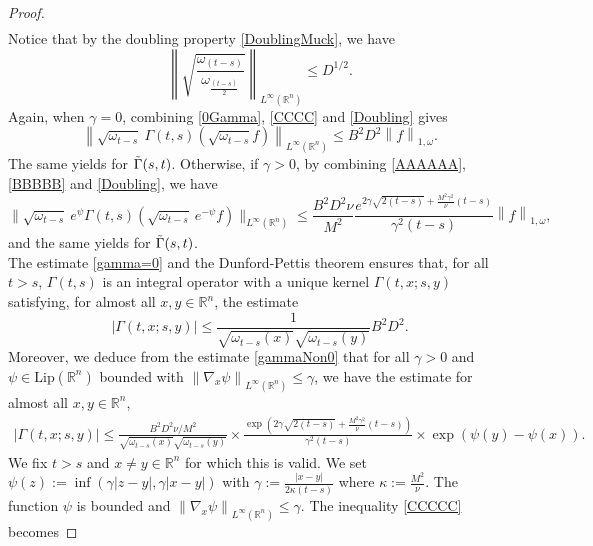 \documentclass[12pt, letterpaper]{amsart}
\theoremstyle{definition}
\theoremstyle{remark}
\numberwithin{equation}{section}
\begin{document}
\begin{proof}
\begin{align*}
\end{align*}
Notice that by the doubling property \eqref{DoublingMuck}, we have 
\begin{equation}\label{Doubling}
    \left \|  \sqrt{\frac{\omega_{(t-s)}}{\omega_{\frac{(t-s)}{2}}}} \right \|_{L^\infty(\mathbb{R}^n)} \leq D^{1/2}.
\end{equation}
Again, when $\gamma=0$, combining \eqref{0Gamma}, \eqref{CCCC} and \eqref{Doubling} gives
\begin{equation}\label{gamma=0}
    \left \| \sqrt{\omega_{t-s}} \ \Gamma(t,s)(\sqrt{\omega_{t-s}} f) \right \|_{L^\infty(\mathbb{R}^n)}\leq B^2 D^2 \left \|f  \right \|_{1,\omega}.
\end{equation}
The same yields for $\Tilde{\Gamma}(s,t)$. Otherwise, if $\gamma>0$, by combining \eqref{AAAAAA}, \eqref{BBBBB} and \eqref{Doubling}, we have
\begin{equation}\label{gammaNon0}
      \| \sqrt{\omega_{t-s}}\ e^\psi \Gamma(t,s)(\sqrt{\omega_{t-s}}\ e^{-\psi}f)  \|_{L^\infty(\mathbb{R}^n)}\leq \frac{B^2D^2\nu}{M^2}\frac{e^{2\gamma \sqrt{2(t-s)}+\frac{M^2\gamma^2}{\nu}(t-s)}}{\gamma^2(t-s)}  \left \|f  \right \|_{1,\omega},
\end{equation}
and the same yields for $\Tilde{\Gamma}(s,t)$.\\
The estimate \eqref{gamma=0} and the Dunford-Pettis theorem \cite{dunford1940linear} ensures that, for all $t>s$, $\Gamma(t,s)$ is an integral operator with a unique kernel $\Gamma(t,x;s,y)$ satisfying, for almost all $x,y \in \mathbb{R}^n$, the estimate
\begin{equation}\label{DDD}
    \left | \Gamma(t,x;s,y) \right |\leq \frac{1}{\sqrt{\omega_{t-s}(x)}\sqrt{\omega_{t-s}(y)}}  B^2 D^2.
\end{equation}
Moreover, we deduce from the estimate \eqref{gammaNon0} that for all $\gamma>0$ and $\psi \in \mathrm{Lip}(\mathbb{R}^n)$ bounded with $\left \| \nabla_x  \psi \right \|_{L^\infty(\mathbb{R}^n)}\leq \gamma$, we have the estimate for almost all $x,y \in \mathbb{R}^n$, 
\begin{align}\label{CCCCC}
    \left | \Gamma(t,x;s,y) \right | \leq \frac{B^2D^2\nu/M^2}{\sqrt{\omega_{t-s}(x)}\sqrt{\omega_{t-s}(y)}} \times \frac{\exp(2\gamma \sqrt{2(t-s)}+\frac{M^2\gamma^2}{\nu}(t-s))}{\gamma^2(t-s)}\times \exp(\psi(y)-\psi(x)).
\end{align}
We fix $t>s$ and $x\neq y\in \mathbb{R}^n$ for which this is valid. We set $\psi(z):=\inf(\gamma\left |z-y  \right |, \gamma \left |x-y  \right |)$ with $\gamma:=\frac{\left |x-y  \right |}{2 \kappa(t-s)}$ where $\kappa:=\frac{M^2}{\nu}$. The function $\psi$ is bounded and $\left \| \nabla_x  \psi \right \|_{L^\infty(\mathbb{R}^n)}\leq \gamma$. The inequality \eqref{CCCCC} becomes 

\end{proof}
\end{document}
